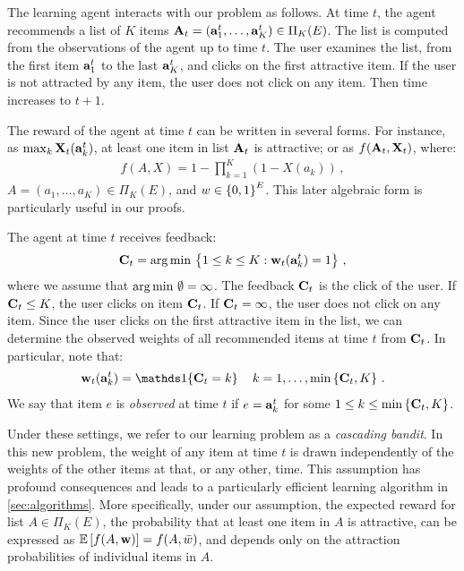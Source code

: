 The learning agent interacts with our problem as follows. At time $t$, the agent recommends a list of $K$ items $\mathbf{A}_t = (\mathbf{a}^t_1, \dots, \mathbf{a}^t_K) \in \Pi_K(E)$. The list is computed from the observations of the agent up to time $t$. The user examines the list, from the first item $\mathbf{a}^t_1$ to the last $\mathbf{a}^t_K$, and clicks on the first attractive item. If the user is not attracted by any item, the user does not click on any item. Then time increases to $t + 1$.

The reward of the agent at time $t$ can be written in several forms. For instance, as $\max_k \mathbf{X}_t(\mathbf{a}^t_k)$, at least one item in list $\mathbf{A}_t$ is attractive; or as $f(\mathbf{A}_t, \mathbf{X}_t)$, where:
\begin{align*}
  f(A, X) = 1 - \prod_{k = 1}^K (1 - X(a_k))\,,
\end{align*}
$A = (a_1, \dots, a_K) \in \Pi_K(E)$, and $w \in \left\{0, 1\right\}^E$. This later algebraic form is particularly useful in our proofs.

The agent at time $t$ receives feedback:
\begin{align*}
  \mathbf{C}_t = \operatorname*{arg\,min\,} \left\{1 \leq k \leq K: \mathbf{w}_t(\mathbf{a}^t_k) = 1\right\}\,,
\end{align*}
where we assume that $\operatorname*{arg\,min\,} \emptyset = \infty$. The feedback $\mathbf{C}_t$ is the click of the user. If $\mathbf{C}_t \leq K$, the user clicks on item $\mathbf{C}_t$. If $\mathbf{C}_t = \infty$, the user does not click on any item. Since the user clicks on the first attractive item in the list, we can determine the observed weights of all recommended items at time $t$ from $\mathbf{C}_t$. In particular, note that:
\begin{align}
  \rnd{w}_t(\rnd{a}^t_k) = \I{\rnd{C}_t = k} \quad k = 1, \dots, \min \set{\rnd{C}_t, K}\,.
  \label{eq:click}
\end{align}
We say that item $e$ is \emph{observed} at time $t$ if $e = \mathbf{a}^t_k$ for some $1 \leq k \leq \min \left\{\mathbf{C}_t, K\right\}$.

Under these settings, we refer to our learning problem as a \emph{cascading bandit}. In this new problem, the weight of any item at time $t$ is drawn independently of the weights of the other items at that, or any other, time. This assumption has profound consequences and leads to a particularly efficient learning algorithm in \cref{sec:algorithms}. More specifically, under our assumption, the expected reward for list $A \in \Pi_K(E)$, the probability that at least one item in $A$ is attractive, can be expressed as $\mathbb{E} \left[f(A, \mathbf{w})\right] = f(A, \bar{w})$, and depends only on the attraction probabilities of individual items in $A$.

